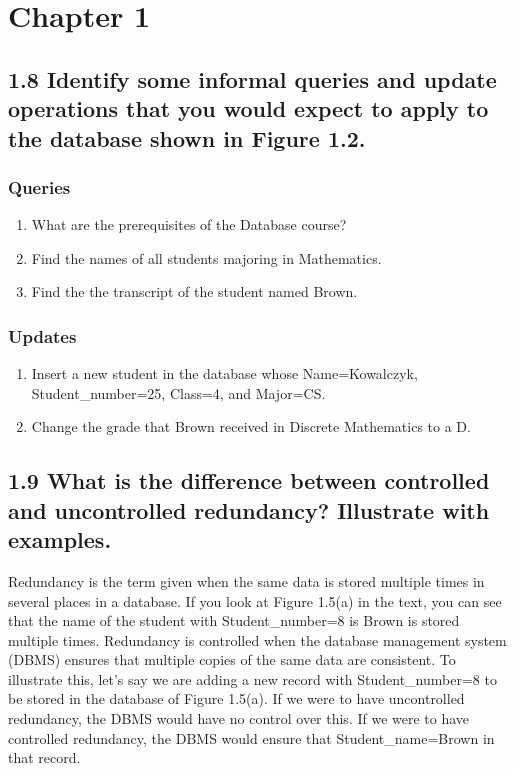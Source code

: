 \section*{Chapter 1}

\subsection*{1.8 Identify some informal queries and update operations that you would expect to apply to the database shown in Figure 1.2.}

\subsubsection*{Queries}

\begin{enumerate}
\item What are the prerequisites of the Database course?
\item Find the names of all students majoring in Mathematics.
\item Find the the transcript of the student named Brown.
\end{enumerate}

\subsubsection*{Updates}

\begin{enumerate}
\item Insert a new student in the database whose Name=Kowalczyk, Student\_number=25, Class=4, and Major=CS.
\item Change the grade that Brown received in Discrete Mathematics to a D.
\end{enumerate}

\subsection*{1.9 What is the difference between controlled and uncontrolled redundancy? Illustrate with examples.}
Redundancy is the term given when the same data is stored multiple times in several places in a database. If you look at Figure 1.5(a)  in the text, you can see that the name of the student with Student\_number=8 is Brown is stored multiple times. Redundancy is controlled when the database management system (DBMS) ensures that multiple copies of the same data are consistent. To illustrate this, let's say we are adding a new record with Student\_number=8 to be stored in the database of Figure 1.5(a). If we were to have uncontrolled redundancy, the DBMS would have no control over this. If we were to have controlled redundancy, the DBMS would ensure that Student\_name=Brown in that record.


